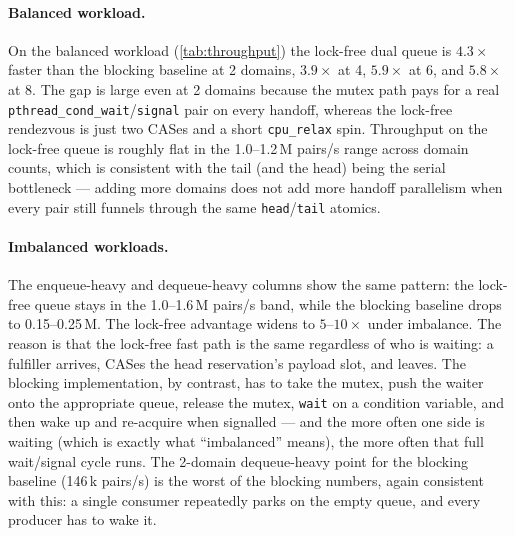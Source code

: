 \documentclass[11pt,a4paper]{article}
\begin{document}
\paragraph{Balanced workload.}
On the balanced workload (\cref{tab:throughput}) the lock-free dual
queue is $4.3\times$ faster than the blocking baseline at 2 domains,
$3.9\times$ at 4, $5.9\times$ at 6, and $5.8\times$ at 8. The gap is
large even at 2 domains because the mutex path pays for a real
\texttt{pthread\_cond\_wait}/\texttt{signal} pair on every handoff,
whereas the lock-free rendezvous is just two CASes and a short
\texttt{cpu\_relax} spin. Throughput on the lock-free queue is
roughly flat in the 1.0--1.2\,M pairs/s range across domain counts,
which is consistent with the tail (and the head) being the serial
bottleneck --- adding more domains does not add more handoff
parallelism when every pair still funnels through the same
\texttt{head}/\texttt{tail} atomics.

\paragraph{Imbalanced workloads.}
The enqueue-heavy and dequeue-heavy columns show the same pattern:
the lock-free queue stays in the 1.0--1.6\,M pairs/s band, while the
blocking baseline drops to 0.15--0.25\,M. The lock-free advantage
widens to $5$--$10\times$ under imbalance. The reason is that the
lock-free fast path is the same regardless of who is waiting: a
fulfiller arrives, CASes the head reservation's payload slot, and
leaves. The blocking implementation, by contrast, has to take the
mutex, push the waiter onto the appropriate queue, release the
mutex, \texttt{wait} on a condition variable, and then wake up and
re-acquire when signalled --- and the more often one side is
waiting (which is exactly what ``imbalanced'' means), the more
often that full wait/signal cycle runs. The 2-domain
dequeue-heavy point for the blocking baseline (146\,k pairs/s) is
the worst of the blocking numbers, again consistent with this: a
single consumer repeatedly parks on the empty queue, and every
producer has to wake it.
\end{document}
